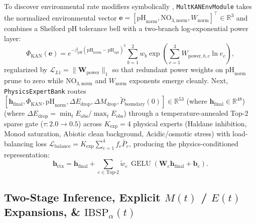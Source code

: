 \documentclass[10pt,twocolumn,a4paper]{article}
\begin{document}
To discover environmental rate modifiers symbolically \cite{liu2024kan2}, \texttt{MultKANEnvModule} takes the normalized environmental vector $\mathbf{e} = [\text{pH}_{\text{norm}}, \text{NO}_{3,\text{norm}}, W_{\text{norm}}]^\top \in \mathbb{R}^3$ and combines a Shelford pH tolerance bell with a two-branch log-exponential power layer:
\begin{equation}
  \Phi_{\text{KAN}}(\mathbf{e}) = e^{-\beta_{\text{pH}}(\text{pH}_{\text{norm}} - \text{pH}_{\text{opt}})^2}\sum_{b=1}^2 w_b\exp\!\left(\sum_{c=1}^3 W_{\text{power},b,c}\ln e_c\right), \label{eq:multkan}
\end{equation}
regularized by $\mathcal{L}_{L1} = \|\mathbf{W}_{\text{power}}\|_1$ so that redundant power weights on $\text{pH}_{\text{norm}}$ prune to zero while $\text{NO}_{3,\text{norm}}$ and $W_{\text{norm}}$ exponents emerge cleanly. Next, \texttt{PhysicsExpertBank} routes $[\mathbf{h}_{\text{final}}, \Phi_{\text{KAN}}, \text{pH}_{\text{norm}}, \Delta E_{\text{drop}}, \Delta M_{\text{drop}}, \tilde{P}_{\text{boundary}}(0)] \in \mathbb{R}^{53}$ (where $\mathbf{h}_{\text{final}} \in \mathbb{R}^{48}$) (where $\Delta E_{\text{drop}} = \min_t E_{\text{obs}}/\max_t E_{\text{obs}}$) through a temperature-annealed Top-2 sparse gate ($\tau: 2.0 \to 0.5$) across $K_{\text{exp}}=4$ physical experts (Haldane inhibition, Monod saturation, Abiotic clean background, Acidic/osmotic stress) with load-balancing loss $\mathcal{L}_{\text{balance}} = K_{\text{exp}}\sum_{e=1}^{4} f_e \bar{P}_e$, producing the physics-conditioned representation:
\begin{equation}
  \mathbf{h}_{\text{ctx}} = \mathbf{h}_{\text{final}} + \sum_{e \in \text{Top-2}} \tilde{w}_e\,\operatorname{GELU}\!\left(\mathbf{W}_e \mathbf{h}_{\text{final}} + \mathbf{b}_e\right). \label{eq:h_ctx}
\end{equation}

\subsection{Two-Stage Inference, Explicit $M(t)$ / $E(t)$ Expansions, \& $\text{IBSP}_\alpha(t)$}
\end{document}
